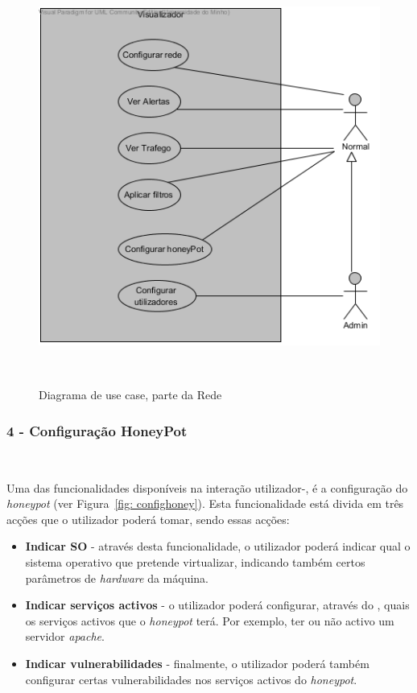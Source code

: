 \begin{figure}[!ht]
	\centering
	\includegraphics[scale=0.80]{images/ucs/Visualizador}
	\caption {Diagrama de use case, parte da Rede}~\label{fig: casodeusovisual}
\end{figure}
\pagebreak

\subsubsection{\textbf{4 - Configuração HoneyPot}}~\label{subsubsec: confighoney}

Uma das funcionalidades disponíveis na interação utilizador-\visualz, é a configuração do \emph{honeypot} (ver Figura~\ref{fig: confighoney}).
Esta funcionalidade está divida em três acções que o utilizador poderá tomar, sendo essas acções:

\begin{itemize}
 \item \textbf{Indicar SO} - através desta funcionalidade, o utilizador poderá indicar qual o sistema operativo que pretende virtualizar, indicando também certos parâmetros de \emph{hardware} da máquina.
 \item \textbf{Indicar serviços activos} - o utilizador poderá configurar, através do \visualz, quais os serviços activos que o \emph{honeypot} terá. Por exemplo, ter ou não activo um servidor \emph{apache}.
 \item \textbf{Indicar vulnerabilidades} - finalmente, o utilizador poderá também configurar certas vulnerabilidades nos serviços activos do \emph{honeypot}.
\end{itemize}

